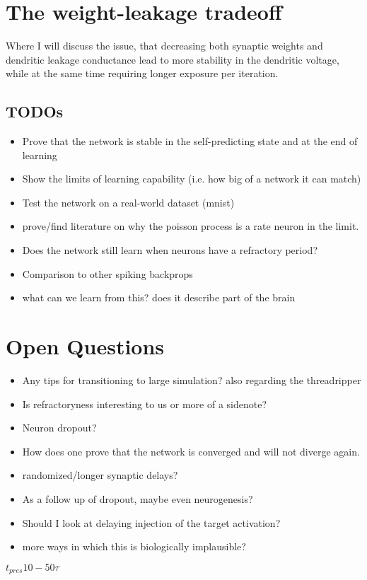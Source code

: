 \documentclass[11pt,a4paper,titlepage]{report}
\begin{document}
\chapter{The weight-leakage tradeoff}

Where I will discuss the issue, that decreasing both synaptic weights and dendritic leakage conductance
lead to more stability in the dendritic voltage, while at the same time requiring longer exposure
per iteration.


\section*{TODOs}

\begin{itemize}
  \item Prove that the network is stable in the self-predicting state and at the end of learning
  \item Show the limits of learning capability (i.e. how big of a network it can match)
  \item Test the network on a real-world dataset (mnist)
  \item prove/find literature on why the poisson process is a rate neuron in the limit.
  \item Does the network still learn when neurons have a refractory period?
  \item Comparison to other spiking backprops
  \item what can we learn from this? does it describe part of the brain
\end{itemize}

\newpage


\chapter{Open Questions}

\begin{itemize}
  \item Any tips for transitioning to large simulation? also regarding the threadripper
  \item Is refractoryness interesting to us or more of a sidenote?
  \item Neuron dropout?
  \item How does one prove that the network is converged and will not diverge again.
  \item randomized/longer synaptic delays?
  \item As a follow up of dropout, maybe even neurogenesis?
  \item Should I look at delaying injection of the target activation?
  \item more ways in which this is biologically implausible?
\end{itemize}

$t_{pres} 10 - 50 \tau$

\end{document}

